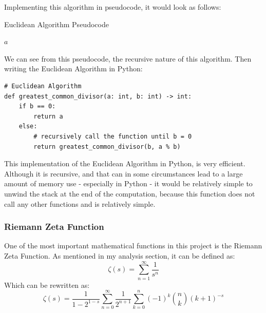 \documentclass{article}
\begin{document}
Implementing this algorithm in pseudocode, it would look as follows:
\begin{algorithm}
    \caption{Euclidean Algorithm Pseudocode}
    \begin{algorithmic}
                \State \Return $a$
            \Else
                \State\Return{}
            \EndIf
        \EndFunction
    \end{algorithmic}
\end{algorithm}

We can see from this pseudocode, the recursive nature of this algorithm.
\clearpage
Then writing the Euclidean Algorithm in Python:

\begin{lstlisting}
# Euclidean Algorithm
def greatest_common_divisor(a: int, b: int) -> int:
    if b == 0:
        return a
    else:
        # recursively call the function until b = 0
        return greatest_common_divisor(b, a % b)
\end{lstlisting}

This implementation of the Euclidean Algorithm in Python, is very efficient. Although it is recursive, and that can in some circumstances lead to a large amount of memory use - especially in Python - it would be relatively simple to unwind the stack at the end of the computation, because this function does not call any other functions and is relatively simple.


\subsubsection{Riemann Zeta Function}
One of the most important mathematical functions in this project is the Riemann Zeta Function. As mentioned in my analysis section, it can be defined as:
    $$\zeta(s) = \sum^{\infty}_{n=1}\frac{1}{s^n}$$
Which can be rewritten as:
    $$\zeta(s) = \frac{1}{1-2^{1-s}} \sum_{n=0}^{\infty} \frac{1}{2^{n+1}} \sum_{k=0}^{n} (-1)^k \binom{n}{k} (k+1)^{-s}$$
\end{document}
